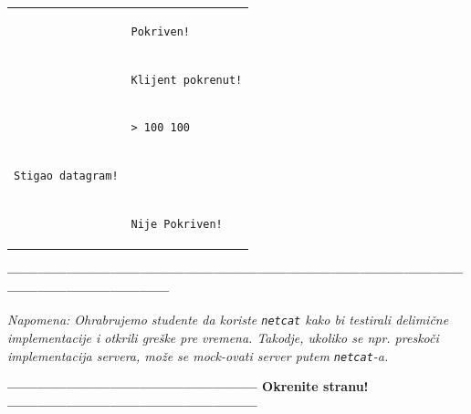 \documentclass[]{article}
\begin{document}
\begin{enumerate}
\begin{tabular}{ll}
\begin{lstlisting}
\end{lstlisting}&\begin{lstlisting}
Pokriven!
\end{lstlisting}\\
&\begin{lstlisting}
Klijent pokrenut!
\end{lstlisting}\\
&\begin{lstlisting}
> 100 100
\end{lstlisting}\\
\begin{lstlisting}
Stigao datagram!
\end{lstlisting}& \\
\begin{lstlisting}
\end{lstlisting}&\begin{lstlisting}
Nije Pokriven!
\end{lstlisting}\\
\end{tabular}

\vspace{10pt}
\begin{center}
  \textbf{------------------------------------------------------------------------------------------------------------------------------}
\end{center}
\textit{Napomena: Ohrabrujemo studente da koriste \texttt{netcat} kako bi testirali delimi\v{c}ne implementacije i otkrili gre\v{s}ke pre vremena. Takodje, ukoliko se npr. presko\v{c}i implementacija servera, mo\v{z}e se mock-ovati server putem \texttt{netcat}-a.} 
\begin{center}
  \textbf{--------------------------------------------------- Okrenite stranu! ---------------------------------------------------}
\end{center}
  

\end{enumerate}
\end{document}
